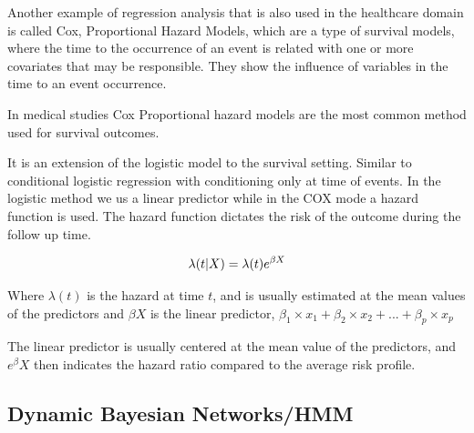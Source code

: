 Another example of regression analysis that is also used in the healthcare domain is called Cox, Proportional Hazard Models, which are a type
 of survival models, where the time to the occurrence of an event is related with one or more covariates that may be responsible. They show the 
 influence of variables in the time to an event occurrence.

In medical studies Cox Proportional hazard models are the most common method used for survival outcomes.

It is an extension of the logistic model to the survival setting. Similar to conditional logistic regression with conditioning only at time of 
events. In the logistic method we us a linear predictor while in the COX mode a hazard function is used. The hazard function dictates the risk of
 the outcome during the follow up time.
 
 \begin{equation}
  {\cal \lambda}(t|X) = {\cal \lambda}(t)e^{\beta X}
\label{eq:hazardFuntion}
\end{equation}

Where \( \lambda(t) \) is the hazard at time \(t\), and is usually estimated at the mean values of the predictors and \( \beta X\) is the linear predictor, 
\( \beta_1 \times x_1 + \beta_2 \times x_2 + ... + \beta_p \times x_p\)

 The linear predictor is usually centered at the mean value of the predictors, and \( e^\beta X \) then indicates the hazard
 ratio compared to the average risk profile.

 
\subsection{Dynamic Bayesian Networks/HMM}
\label{subsection:dbn}	
 
